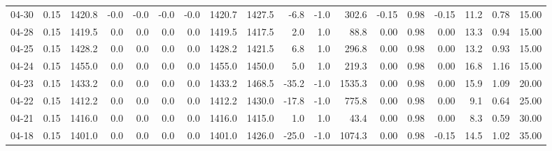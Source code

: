 \begin{threeparttable}
{\begin{tabular}{lrrrrrrrrrrrrrrrrr}
  04-30 &     0.15 & 1420.8 &              -0.0 &              -0.0 &               -0.0 &               -0.0 & 1420.7 & 1427.5 &       -6.8 &                     -1.0 &               302.6 &      -0.15 &      0.98 &          -0.15 &             11.2 &            0.78 &                  15.00 \\
  04-28 &     0.15 & 1419.5 &               0.0 &               0.0 &                0.0 &                0.0 & 1419.5 & 1417.5 &        2.0 &                      1.0 &                88.8 &       0.00 &      0.98 &           0.00 &             13.3 &            0.94 &                  15.00 \\
  04-25 &     0.15 & 1428.2 &               0.0 &               0.0 &                0.0 &                0.0 & 1428.2 & 1421.5 &        6.8 &                      1.0 &               296.8 &       0.00 &      0.98 &           0.00 &             13.2 &            0.93 &                  15.00 \\
  04-24 &     0.15 & 1455.0 &               0.0 &               0.0 &                0.0 &                0.0 & 1455.0 & 1450.0 &        5.0 &                      1.0 &               219.3 &       0.00 &      0.98 &           0.00 &             16.8 &            1.16 &                  15.00 \\
  04-23 &     0.15 & 1433.2 &               0.0 &               0.0 &                0.0 &                0.0 & 1433.2 & 1468.5 &      -35.2 &                     -1.0 &              1535.3 &       0.00 &      0.98 &           0.00 &             15.9 &            1.09 &                  20.00 \\
  04-22 &     0.15 & 1412.2 &               0.0 &               0.0 &                0.0 &                0.0 & 1412.2 & 1430.0 &      -17.8 &                     -1.0 &               775.8 &       0.00 &      0.98 &           0.00 &              9.1 &            0.64 &                  25.00 \\
  04-21 &     0.15 & 1416.0 &               0.0 &               0.0 &                0.0 &                0.0 & 1416.0 & 1415.0 &        1.0 &                      1.0 &                43.4 &       0.00 &      0.98 &           0.00 &              8.3 &            0.59 &                  30.00 \\
  04-18 &     0.15 & 1401.0 &               0.0 &               0.0 &                0.0 &                0.0 & 1401.0 & 1426.0 &      -25.0 &                     -1.0 &              1074.3 &       0.00 &      0.98 &          -0.15 &             14.5 &            1.02 &                  35.00 \\

\end{tabular}}
\end{threeparttable}
